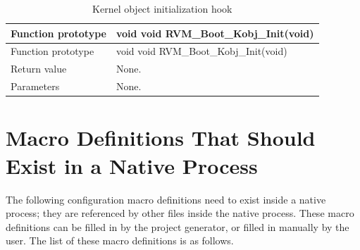 \begin{xltabular}{\textwidth}{@{}>{\hsize\raggedright\arraybackslash}X>{\hsize\raggedright\arraybackslash}X@{}}
\caption{Kernel object initialization hook}\label{tab:3-3}\\
\toprule
Function prototype & void void RVM\_\allowbreak{}Boot\_\allowbreak{}Kobj\_\allowbreak{}Init(void)\tabularnewline
\endfirsthead
\toprule
Function prototype & void void RVM\_\allowbreak{}Boot\_\allowbreak{}Kobj\_\allowbreak{}Init(void)\tabularnewline
\midrule
\endhead
\bottomrule
\endlastfoot
Return value & None.\tabularnewline
Parameters & None.\tabularnewline
\end{xltabular}

\section{Macro Definitions That Should Exist in a Native Process}\label{sec:3-4}

The following configuration macro definitions need to exist inside a native process; they are referenced by other files inside the native process. These macro definitions can be filled in by the project generator, or filled in manually by the user. The list of these macro definitions is as follows.

